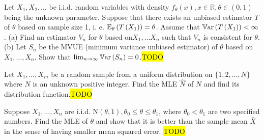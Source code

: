 \begin{example}
\label{exa:isi2006samplepsb9}Let $X_{1},X_{2},\ldots$ be i.i.d.
random variables with density $f_{\theta}(x),x\in\mathbb{R},\theta\in(0,1)$
being the unknown parameter. Suppose that there exists an unbiased
estimator $T$ of $\theta$ based on sample size 1, i. e. $\mathbb{E}_{\theta}\left(T\left(X_{1}\right)\right)=\theta$.
Assume that $\mathbb{V\mathrm{ar}}\left(T\left(X_{1}\right)\right)<\infty$. (a) Find
an estimator $V_{n}$ for $\theta$ based on$X_{1},\ldots X_{n}$
such that $V_{n}$ is consistent for $\theta$. (b) Let $S_{n}$ be
the MVUE (minimum variance unbiased estimator) of $\theta$ based
on $X_{1},\ldots,X_{n}$. Show that $\lim_{n\rightarrow\infty}\mathbb{V\mathrm{ar}}\left(S_{n}\right)=0$.\hl{TODO}
\end{example}

\begin{example}
\label{exa:isi2008samplepsb9}Let $X_{1},\ldots,X_{m}$ be a random
sample from a uniform distribution on $\{1,2,\ldots,N\}$ where $N$
is an unknown positive integer. Find the MLE $\widehat{N}$ of $N$
and find its distribution function.\hl{TODO}
\end{example}

\begin{example}
	\label{exa:isi2009samplepsb6}
	Suppose $X_1, \ldots, X_n$ are i.i.d. $\mathrm{N}(\theta, 1), \theta_0 \leq \theta \leq \theta_1$, where $\theta_0<\theta_1$ are two specified numbers. Find the MLE of $\theta$ and show that it is better than the sample mean $\bar{X}$ in the sense of having smaller mean squared error.
	\hl{TODO}
\end{example}


